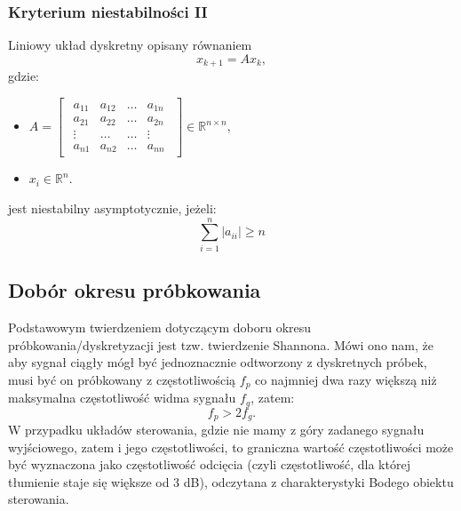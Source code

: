 \documentclass{article}
\begin{document}
        \subsubsection{Kryterium niestabilności II}
        Liniowy układ dyskretny opisany równaniem
        $$
            x_{k+1} = Ax_{k},
        $$
        gdzie:
        \begin{itemize}
            \item $A
            =
            \begin{bmatrix}
            \begin{array}{cccc}
                a_{11}  &   a_{12}  &   \dots   &   a_{1n}\\
                a_{21}  &   a_{22}  &   \dots   &   a_{2n}\\
                \vdots  &   \dots   &   \dots   &   \vdots\\
                a_{n1}  &   a_{n2}  &   \dots   &   a_{nn}
            \end{array}
            \end{bmatrix}
            \in \mathbb{R}^{n \times n},
            $
            \item $x_{i} \in \mathbb{R}^{n}$.
        \end{itemize}
        jest niestabilny asymptotycznie, jeżeli:
        $$
            \sum_{i=1}^{n}{|a_{ii}|} \geq n
        $$

    \subsection{Dobór okresu próbkowania}
    Podstawowym twierdzeniem dotyczącym doboru okresu próbkowania/dyskretyzacji jest tzw. twierdzenie Shannona.
    Mówi ono nam, że aby sygnał ciągły mógł być jednoznacznie odtworzony z dyskretnych próbek, musi być on próbkowany z częstotliwością $f_{p}$ co najmniej dwa razy większą niż maksymalna częstotliwość widma sygnału $f_{g}$, zatem:
    $$
        f_{p} > 2f_{g}.
    $$
    W przypadku układów sterowania, gdzie nie mamy z góry zadanego sygnału wyjściowego, zatem i jego częstotliwości, to graniczna wartość częstotliwości może być wyznaczona jako częstotliwość odcięcia (czyli częstotliwość, dla której tłumienie staje się większe od 3 dB), odczytana z charakterystyki Bodego obiektu sterowania.

\end{document}
